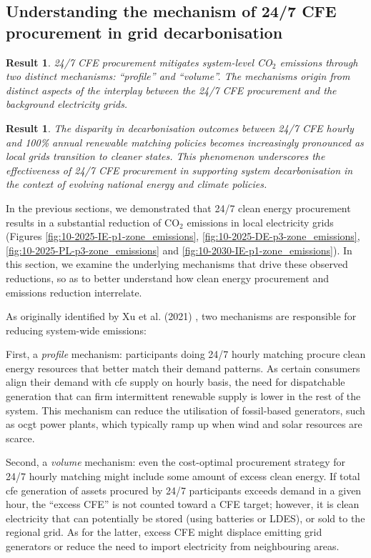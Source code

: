 \documentclass[11pt, 5p, nopreprintline]{elsarticle}
\newtheorem{res}[thm]{Result}  %
\begin{document}
\subsection{Understanding the mechanism of 24/7 CFE procurement in grid decarbonisation}
\label{subsec:mechanisms}

\begin{res}
    24/7 CFE procurement mitigates system-level CO$_2$ \newline
    emissions through two distinct mechanisms: \enquote{profile} and \enquote{volume}. The mechanisms origin from distinct aspects of the interplay between the 24/7 CFE procurement and the background electricity grids.
\end{res}

\begin{res}
    The disparity in decarbonisation outcomes between 24/7 CFE hourly and 100\% annual renewable matching policies becomes increasingly pronounced as local grids transition to cleaner states. This phenomenon underscores the effectiveness of 24/7 CFE procurement in supporting system decarbonisation in the context of evolving national energy and climate policies.
\end{res}

In the previous sections, we demonstrated that 24/7 clean energy procurement results in a substantial reduction of CO$_2$ emissions in local electricity grids (Figures \ref{fig:10-2025-IE-p1-zone_emissions}, \ref{fig:10-2025-DE-p3-zone_emissions}, \ref{fig:10-2025-PL-p3-zone_emissions} and \ref{fig:10-2030-IE-p1-zone_emissions}).
In this section, we examine the underlying mechanisms that drive these observed reductions, so as to better understand how clean energy procurement and emissions reduction interrelate.

As originally identified by Xu et al. (2021) \cite{xu-247CFE-report}, two mechanisms are responsible for reducing system-wide emissions:

First, a \textit{profile} mechanism: participants doing 24/7 hourly matching procure clean energy resources that better match their demand patterns.
As certain consumers align their demand with \gls{cfe} supply on hourly basis, the need for dispatchable generation that can firm intermittent renewable supply is lower in the rest of the system.
This mechanism can reduce the utilisation of fossil-based generators, such as \gls{ocgt} power plants, which typically ramp up when wind and solar resources are scarce.

Second, a \textit{volume} mechanism: even the cost-optimal procurement strategy for 24/7 hourly matching might include some amount of excess clean energy.
If total \gls{cfe} generation of assets procured by 24/7 participants exceeds demand in a given hour, the \enquote{excess CFE} is not counted toward a CFE target; however, it is clean electricity that can potentially be stored (using batteries or LDES), or sold to the regional grid.
As for the latter, excess CFE might displace emitting grid generators or reduce the need to import electricity from neighbouring areas.
\end{document}
